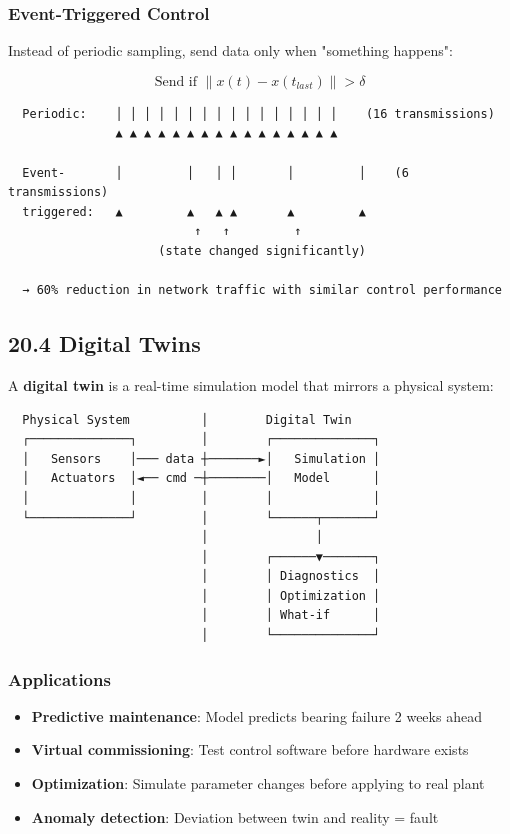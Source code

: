 \documentclass[11pt,a4paper]{book}
\begin{document}
\begin{itemize}
\subsubsection{Event-Triggered Control}

Instead of periodic sampling, send data only when "something happens":

\[\text{Send if } \|x(t) - x(t_{last})\| > \delta\]

\begin{lstlisting}
  Periodic:    │ │ │ │ │ │ │ │ │ │ │ │ │ │ │ │    (16 transmissions)
               ▲ ▲ ▲ ▲ ▲ ▲ ▲ ▲ ▲ ▲ ▲ ▲ ▲ ▲ ▲ ▲
  
  Event-       │         │   │ │       │         │    (6 transmissions)
  triggered:   ▲         ▲   ▲ ▲       ▲         ▲
                          ↑   ↑         ↑
                     (state changed significantly)
  
  → 60% reduction in network traffic with similar control performance
\end{lstlisting}

\medskip\noindent\hrulefill\medskip

\subsection{20.4 Digital Twins}

A \textbf{digital twin} is a real-time simulation model that mirrors a physical system:

\begin{lstlisting}
  Physical System          │        Digital Twin
  ┌──────────────┐         │        ┌──────────────┐
  │   Sensors    │─── data ┼───────►│   Simulation │
  │   Actuators  │◄── cmd ─┼────────│   Model      │
  │              │         │        │              │
  └──────────────┘         │        └──────┬───────┘
                           │               │
                           │        ┌──────▼───────┐
                           │        │ Diagnostics  │
                           │        │ Optimization │
                           │        │ What-if      │
                           │        └──────────────┘
\end{lstlisting}

\subsubsection{Applications}

\begin{itemize}
\item \textbf{Predictive maintenance}: Model predicts bearing failure 2 weeks ahead
\item \textbf{Virtual commissioning}: Test control software before hardware exists
\item \textbf{Optimization}: Simulate parameter changes before applying to real plant
\item \textbf{Anomaly detection}: Deviation between twin and reality = fault
\end{itemize}


\end{itemize}
\end{document}
